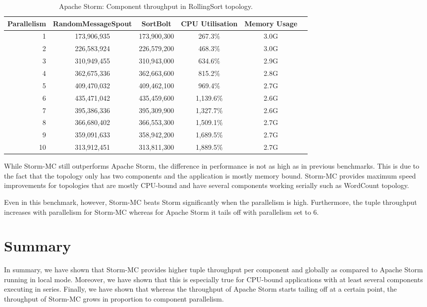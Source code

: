 \begin{table}[!htb]
\begin{adjustwidth}{-0.5in}{-0.5in}
\centering
\small
\begin{tabular}{@{}rccccl@{}}
    \textbf{Parallelism} & \textbf{RandomMessageSpout} & \textbf{SortBolt} & \textbf{CPU Utilisation} & \textbf{Memory Usage} \\ \toprule
    1 & {173,906,935} & {173,900,300} & {267.3\%} & {3.0G} \\
    2 & {226,583,924} & {226,579,200} & {468.3\%} & {3.0G} \\
    3 & {310,949,455} & {310,943,000} & {634.6\%} & {2.9G} \\
    4 & {362,675,336} & {362,663,600} & {815.2\%} & {2.8G} \\
    5 & {409,470,032} & {409,462,100} & {969.4\%} & {2.7G} \\
    6 & {435,471,042} & {435,459,600} & {1,139.6\%} & {2.6G} \\
    7 & {395,386,336} & {395,309,900} & {1,327.7\%} & {2.6G} \\
    8 & {366,680,402} & {366,553,300} & {1,509.1\%} & {2.7G} \\
    9 & {359,091,633} & {358,942,200} & {1,689.5\%} & {2.7G} \\
    10 & {313,912,451} & {313,811,300} & {1,889.5\%} & {2.7G} \\
\end{tabular}
\caption{Apache Storm: Component throughput in RollingSort topology.}
\label{table:storm_rolling}
\end{adjustwidth}
\end{table}

While Storm-MC still outperforms Apache Storm, the difference in performance is not as high as in previous benchmarks. This is due to the fact that the topology only has two components and the application is mostly memory bound. Storm-MC provides maximum speed improvements for topologies that are mostly CPU-bound and have several components working serially such as WordCount topology.

Even in this benchmark, however, Storm-MC beats Storm significantly when the parallelism is high. Furthermore, the tuple throughput increases with parallelism for Storm-MC whereas for Apache Storm it tails off with parallelism set to 6.

\section{Summary}

In summary, we have shown that Storm-MC provides higher tuple throughput per component and globally as compared to Apache Storm running in local mode. Moreover, we have shown that this is especially true for CPU-bound applications with at least several components executing in series. Finally, we have shown that whereas the throughput of Apache Storm starts tailing off at a certain point, the throughput of Storm-MC grows in proportion to component parallelism.

